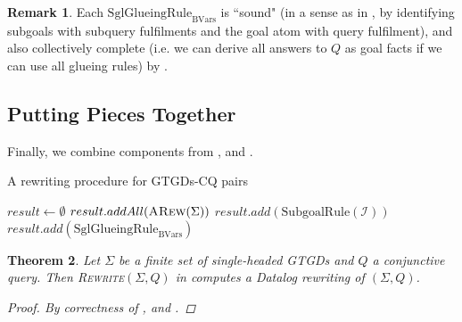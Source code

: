\documentclass[12pt]{report}
\theoremstyle{plain}
\newtheorem{theorem}{Theorem}[chapter]
\theoremstyle{definition}
\newtheorem{remark}[theorem]{Remark}
\def\FV{{\mathrm{FV}}}
\def\Vars{{\mathrm{Vars}}}
\newcommand{\ARew}[1]{\ensuremath{\normalfont{\textsc{ARew}}\!\left( #1 \right)}}
\begin{document}
\begin{remark}
\label{remark:glueing-rule-soundness-and-completeness}
  Each $\mathrm{SglGlueingRule}_\mathrm{BVars}$ is ``sound" (in a sense as in , by identifying subgoals with subquery fulfilments and the goal atom with query fulfilment), and also collectively complete (i.e. we can derive all answers to $Q$ as goal facts if we can use all glueing rules) by .
\end{remark}

\subsection{Putting Pieces Together}

Finally, we combine components from ,  and .

\begin{algorithm}
\caption{A rewriting procedure for GTGDs-CQ pairs}
\label{algorithm:gtgds-cq-rewriting-procedure}
\begin{algorithmic}[1]
  \State $result \gets \emptyset$
  \State $result.addAll(\ARew{\Sigma})$
    \State $result.add(\mathrm{SubgoalRule}(\mathcal{I}))$
  \EndFor
  \For{\textbf{each} $\FV(Q) \subseteq \mathrm{BVars} \subseteq \Vars(Q)$ }
    \State $result.add(\mathrm{SglGlueingRule}_{\mathrm{BVars}})$
  \EndFor
  \State {}
\EndProcedure
\end{algorithmic}
\end{algorithm}

\begin{theorem}
  Let $\Sigma$ be a finite set of single-headed GTGDs and $Q$ a conjunctive query. Then \textsc{Rewrite}$(\Sigma, Q)$ in  computes a Datalog rewriting of $(\Sigma, Q)$.
  \begin{proof}
    By correctness of ,  and .
  \end{proof}
\end{theorem}
\end{document}
